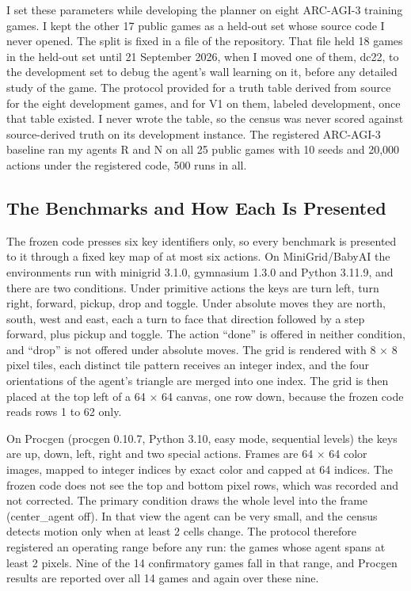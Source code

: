 \documentclass[twocolumn]{svjour3}
\begin{document}
I set these parameters while developing the planner on eight ARC-AGI-3
training games. I kept the other 17 public games as a held-out set whose
source code I never opened. The split is fixed in a file of the
repository. That file held 18 games in the held-out set until 21
September 2026, when I moved one of them, dc22, to the development set
to debug the agent's wall learning on it, before any detailed study of
the game. The protocol provided for a truth table derived from source
for the eight development games, and for V1 on them, labeled
development, once that table existed. I never wrote the table, so the
census was never scored against source-derived truth on its development
instance. The registered ARC-AGI-3 baseline ran my agents R and N on all
25 public games with 10 seeds and 20,000 actions under the registered
code, 500 runs in all.

\subsection{The Benchmarks and How Each Is
Presented}\label{sec:benchmarks}

The frozen code presses six key identifiers only, so every benchmark is
presented to it through a fixed key map of at most six actions. On
MiniGrid/BabyAI the environments run with minigrid 3.1.0, gymnasium
1.3.0 and Python 3.11.9, and there are two conditions. Under primitive
actions the keys are turn left, turn right, forward, pickup, drop and
toggle. Under absolute moves they are north, south, west and east, each
a turn to face that direction followed by a step forward, plus pickup
and toggle. The action ``done'' is offered in neither condition, and
``drop'' is not offered under absolute moves. The grid is rendered with
8 × 8 pixel tiles, each distinct tile pattern receives an integer index,
and the four orientations of the agent's triangle are merged into one
index. The grid is then placed at the top left of a 64 × 64 canvas, one
row down, because the frozen code reads rows 1 to 62 only.

On Procgen (procgen 0.10.7, Python 3.10, easy mode, sequential levels)
the keys are up, down, left, right and two special actions. Frames are
64 × 64 color images, mapped to integer indices by exact color and
capped at 64 indices. The frozen code does not see the top and bottom
pixel rows, which was recorded and not corrected. The primary condition
draws the whole level into the frame (center\_agent off). In that view
the agent can be very small, and the census detects motion only when at
least 2 cells change. The protocol therefore registered an operating
range before any run: the games whose agent spans at least 2 pixels.
Nine of the 14 confirmatory games fall in that range, and Procgen
results are reported over all 14 games and again over these nine.
\end{document}
